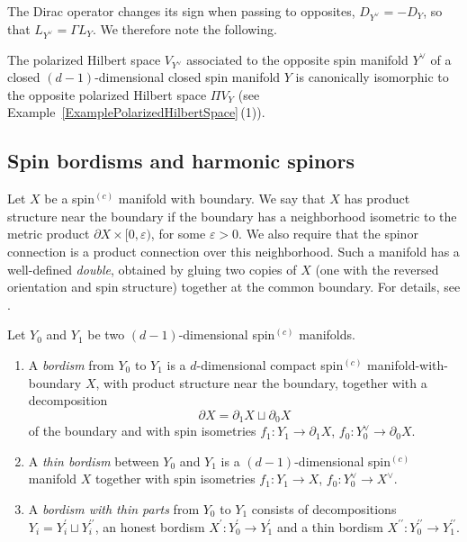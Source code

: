 \documentclass[pdftex]{sigma}
\numberwithin{equation}{section}
\begin{document}
The Dirac operator changes its sign when passing to opposites, $D_{Y^\vee} = - D_Y$, so that ${L_{Y^\vee} = \Gamma L_Y}$.
We therefore note the following.

\begin{Observation} \label{ObservationOppositeManifold}
The polarized Hilbert space $V_{Y^\vee}$ associated to the opposite spin manifold $Y^\vee$ of a closed $(d-1)$-dimensional closed spin manifold $Y$ is canonically isomorphic to the opposite polarized Hilbert space $\Pi V_Y$ (see Example~\ref{ExamplePolarizedHilbertSpace}\,(1)).
\end{Observation}

\subsection{Spin bordisms and harmonic spinors}

Let $X$ be a spin$^{(c)}$ manifold with boundary.
We say that $X$ has product structure near the boundary if the boundary has a neighborhood isometric to the metric product $\partial X \times [0, \varepsilon)$, for some $\varepsilon >0$.
We also require that the spinor connection is a product connection over this neighborhood.
Such a manifold has a well-defined \emph{double}, obtained by gluing two copies of $X$ (one with the reversed orientation and spin structure) together at the common boundary.
For details, see \cite[Section~I.9]{BBW}.

\begin{Definition}[bordisms]
Let $Y_0$ and $Y_1$ be two $(d-1)$-dimensional spin$^{(c)}$ manifolds.
\begin{enumerate}\itemsep=0pt
\item[(a)]
A \emph{bordism} from $Y_0$ to $Y_1$ is a $d$-dimensional compact spin$^{(c)}$ manifold-with-boundary $X$, with product structure near the boundary, together with a decomposition \[\partial X = \partial_1 X \sqcup \partial_0 X\] of the boundary and with spin isometries $f_1\colon Y_1 \to \partial_1 X$, $f_0\colon Y_0^\vee \to \partial_0 X$.
\item[(b)]
A \emph{thin bordism} between $Y_0$ and $Y_1$ is a $(d-1)$-dimensional spin$^{(c)}$ manifold $X$ together with spin isometries $f_1\colon Y_1 \to X$, $f_0\colon Y_0^\vee \to X^\vee$.
\item[(c)]
A \emph{bordism with thin parts} from $Y_0$ to $Y_1$ consists of decompositions $Y_i = Y_i^\prime \sqcup Y_i^{\prime\prime}$, an honest bordism $X^\prime\colon Y_0^\prime \to Y_1^\prime$ and a thin bordism $X^{\prime\prime}\colon Y_0^{\prime\prime} \to Y_1^{\prime\prime}$.
\end{enumerate}
\end{Definition}
\end{document}
